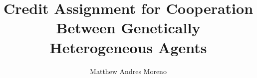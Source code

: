 \documentclass[12pt]{article}
\title{\large Credit Assignment for Cooperation Between Genetically Heterogeneous Agents}
\author{Matthew Andres Moreno}
\theoremstyle{definition}
\begin{document}
\section*{\thetitle}









\end{document}
